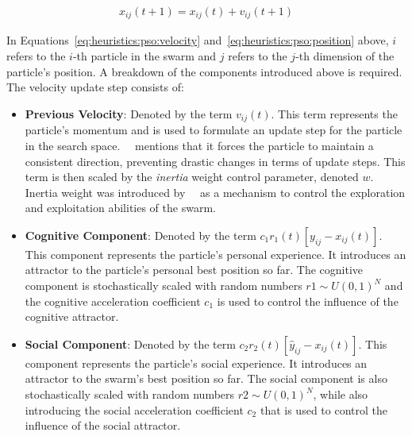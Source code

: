 \begin{equation}
      \label{eq:heuristics:pso:position}
      \begin{split}
            x_{ij}(t+1) = x_{ij}(t) + v_{ij}(t+1)
      \end{split}
\end{equation}

\noindent
In Equations~\eqref{eq:heuristics:pso:velocity} and~\eqref{eq:heuristics:pso:position} above, $i$ refers to the $i$-th particle in the swarm and $j$ refers to the $j$-th dimension of  the particle's position. A breakdown of the components introduced above is required. The velocity update step consists of:

\begin{itemize}
      \item \textbf{Previous Velocity}: Denoted by the term $v_{ij}(t)$. This term represents the particle's momentum and is used to formulate an update step for the particle in the search space.~\citeauthor{ref:vanwyk:2014}~\cite{ref:vanwyk:2014} mentions that it forces the particle to maintain a consistent direction, preventing drastic changes in terms of update steps. This term is then scaled by the \textit{inertia} weight control parameter, denoted $w$. Inertia weight was introduced by~\citeauthor{ref:shi:1998}~\cite{ref:shi:1998} as a mechanism to control the exploration and exploitation abilities of the swarm.

      \item \textbf{Cognitive Component}: Denoted by the term $c_{1}r_{1}(t)[y_{ij} - x_{ij}(t)]$. This component represents the particle's personal  experience. It introduces an attractor to the particle's personal best position so far. The cognitive component is stochastically scaled with random numbers $r{1} \sim U(0,1)^N$ and the cognitive acceleration coefficient $c_{1}$ is used to control the influence of the cognitive attractor.

      \item \textbf{Social Component}: Denoted by the term $c_{2}r_{2}(t)[\hat{y}_{ij} - x_{ij}(t)]$. This component represents the particle's social  experience. It introduces an attractor to the swarm's best position so far. The social component is also stochastically scaled with random numbers $r{2} \sim U(0,1)^N$, while also introducing the social acceleration coefficient $c_{2}$ that is used to control the influence of the social attractor.
\end{itemize}

